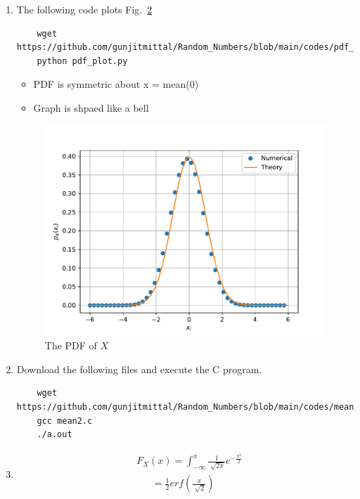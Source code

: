 \documentclass[journal,12pt,twocolumn]{IEEEtran}
\renewcommand\thesection{\arabic{section}}
\begin{document}
\begin{enumerate}[label=\thesection.\arabic*
,ref=\thesection.\theenumi]
\begin{figure}[h]
        \caption{The CDF of $X$}\label{fig:gauss_cdf}
        \end{figure}
    \item\solution{}
    The following code plots Fig.~\ref{fig:gauss_pdf}
    \begin{lstlisting}
    wget https://github.com/gunjitmittal/Random_Numbers/blob/main/codes/pdf_plot.py
    python pdf_plot.py
    \end{lstlisting}
    \begin{itemize}
        \item PDF is symmetric about x = mean(0)\\ 
        \item Graph is shpaed like a bell\\
    \end{itemize}
    \begin{figure}[h]
    \centering
    \includegraphics[width=\columnwidth]{../figs/gauss_pdf}
    \caption{The PDF of $X$}\label{fig:gauss_pdf}
    \end{figure}
    \item \solution{} Download the following files and execute the  C program.
    \begin{lstlisting}
    wget https://github.com/gunjitmittal/Random_Numbers/blob/main/codes/mean2.c
    gcc mean2.c
    ./a.out
    \end{lstlisting}
    \item \begin{align}
        &F_X(x) = \int_{-\infty}^{x} \frac{1}{\sqrt[]{2\pi}}e^{-\frac{x^2}{2}}\\
        &~~~~~~~= \frac{1}{2} erf(\frac{x}{\sqrt[]{2}})\\

\end{align}
\end{enumerate}
\end{document}
